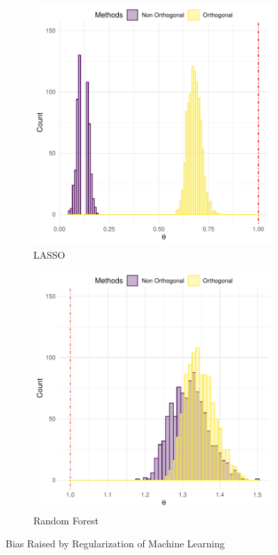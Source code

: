 \documentclass[en,mtpro2]{elegantpaper}
\begin{document}
\begin{figure}[htpb]
    \centering
    \begin{subfigure}{.45\textwidth}
        \centering
        \includegraphics[width=\linewidth]{figures/intution-non-orthogonal-vs-orthogonal-lasso.pdf}
        \caption{LASSO}
    \end{subfigure}
    \begin{subfigure}{.45\textwidth}
        \centering
        \includegraphics[width=\linewidth]{figures/intution-non-orthogonal-vs-orthogonal-rf.pdf}
        \caption{Random Forest}
    \end{subfigure}
    \caption{Bias Raised by Regularization of Machine Learning}
\end{figure}
\end{document}

